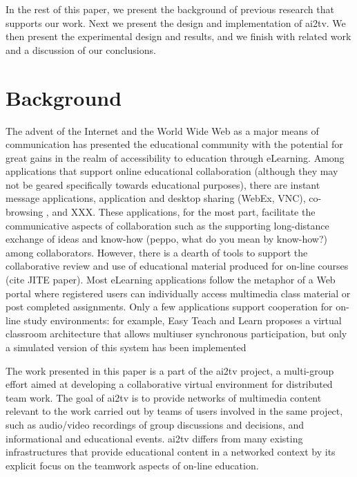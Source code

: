 \documentclass{sig-alternate}
\begin{document}
In the rest of this paper, we present the background of previous
research that supports our work.  Next we present the design and
implementation of ai2tv.  We then present the experimental
design and results, and we finish with related work and a discussion
of our conclusions.


\section{Background} \label{background}
The advent of the Internet and the World Wide Web as a major means of
communication has presented the educational community with the
potential for great gains in the realm of accessibility to education
through eLearning.  Among applications that support online educational
collaboration (although they may not be geared specifically towards
educational purposes), there are instant message applications,
application and desktop sharing (WebEx, VNC), co-browsing \cite{CAPPS,
LIEBERMAN, SIDLER}, and XXX.  These applications, for the most part,
facilitate the communicative aspects of collaboration such as the
supporting long-distance exchange of ideas and know-how (peppo, what
do you mean by know-how?) among collaborators.  However, there is a
dearth of tools to support the collaborative review and use of
educational material produced for on-line courses (cite JITE paper).
Most eLearning applications follow the metaphor of a Web portal where
registered users can individually access multimedia class material or
post completed assignments.  Only a few applications support
cooperation for on-line study environments: for example, Easy Teach
and Learn proposes a virtual classroom architecture that allows
multiuser synchronous participation, but only a simulated version of
this system has been implemented \cite{WALTER}

The work presented in this paper is a part of the ai2tv
project, a multi-group effort aimed at developing a collaborative
virtual environment for distributed team work.  The goal of
ai2tv is to provide networks of multimedia content
relevant to the work carried out by teams of users involved in the
same project, such as audio/video recordings of group discussions and
decisions, and informational and educational events.
ai2tv differs from many existing infrastructures that
provide educational content in a networked context by its explicit
focus on the teamwork aspects of on-line education.
\end{document}
